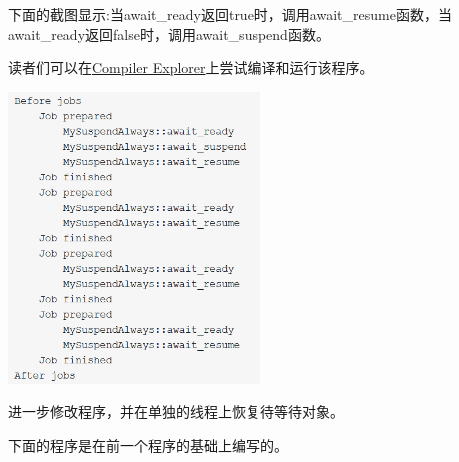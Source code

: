 下面的截图显示:当await\_ready返回true时，调用await\_resume函数，当await\_ready返回false时，调用await\_suspend函数。

读者们可以在\href{https://godbolt.org/z/8b1Y14}{Compiler Explorer}上尝试编译和运行该程序。

\begin{center}
\includegraphics[width=0.5\textwidth]{content/3/chapter7/images/20.png}\\
\end{center}

进一步修改程序，并在单独的线程上恢复待等待对象。


下面的程序是在前一个程序的基础上编写的。

